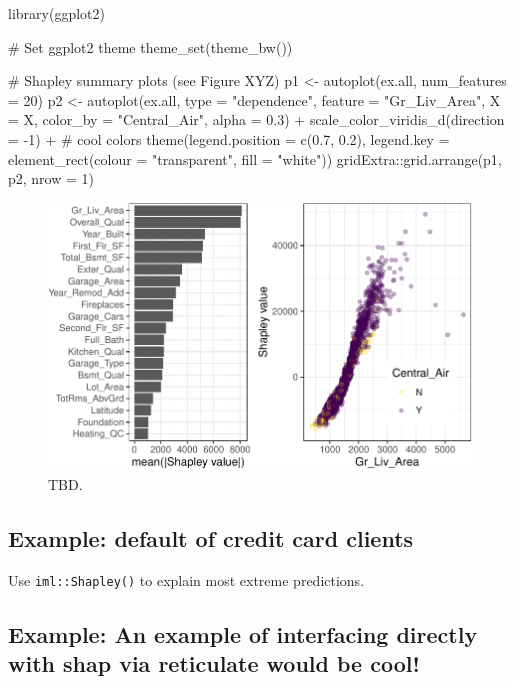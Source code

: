 \begin{Schunk}
\begin{Sinput}
library(ggplot2)

# Set ggplot2 theme
theme_set(theme_bw())

# Shapley summary plots (see Figure XYZ)
p1 <- autoplot(ex.all, num_features = 20)
p2 <- autoplot(ex.all, type = "dependence", feature = "Gr_Liv_Area", X = X,
               color_by = "Central_Air", alpha = 0.3) +
  scale_color_viridis_d(direction = -1) +  # cool colors
  theme(legend.position = c(0.7, 0.2), 
        legend.key = element_rect(colour = "transparent", fill = "white"))
gridExtra::grid.arrange(p1, p2, nrow = 1)
\end{Sinput}
\begin{figure}[!htb]

{\centering \includegraphics[width=1\linewidth]{greenwell_files/figure-latex/ex-ames-fastshap-autoplot-1} 

}

\caption[TBD]{TBD.}\label{fig:ex-ames-fastshap-autoplot}
\end{figure}
\end{Schunk}

\hypertarget{example-default-of-credit-card-clients}{%
\subsection{Example: default of credit card
clients}\label{example-default-of-credit-card-clients}}

Use \texttt{iml::Shapley()} to explain most extreme predictions.

\hypertarget{example-an-example-of-interfacing-directly-with-shap-via-reticulate-would-be-cool}{%
\subsection{Example: An example of interfacing directly with shap via
reticulate would be
cool!}\label{example-an-example-of-interfacing-directly-with-shap-via-reticulate-would-be-cool}}

